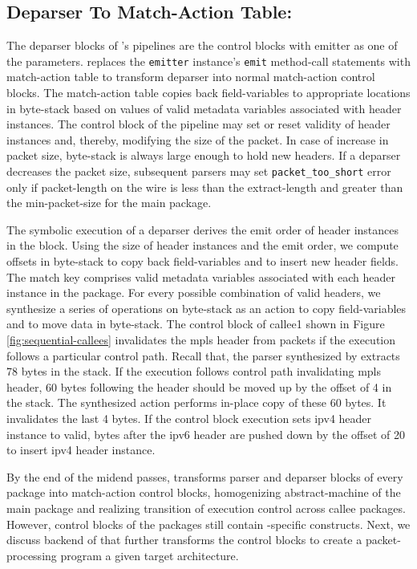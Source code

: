 \documentclass[letterpaper,twocolumn,10pt]{article}
\begin{document}
\subsection{Deparser To Match-Action Table:}
\label{subsection:deparser-to-match-action-table}
The deparser blocks of \uarch's pipelines are the control blocks with emitter as one of the parameters.
\ucomp replaces the \texttt{emitter} instance's \texttt{emit} method-call statements with match-action table to transform deparser into normal match-action control blocks.
The match-action table copies back field-variables to appropriate locations in byte-stack based on values of valid metadata variables associated with header instances. 
The control block of the pipeline may set or reset validity of header instances and, thereby, modifying the size of the packet.
In case of increase in packet size, byte-stack is always large enough to hold new headers.
If a deparser decreases the packet size, subsequent parsers may set \texttt{packet\_too\_short} error only if packet-length on the wire is less than the extract-length and greater than the min-packet-size for the main package.

The symbolic execution of a deparser derives the emit order of header instances in the block.
Using the size of header instances and the emit order, we compute offsets in byte-stack to copy back field-variables and to insert new header fields.
The match key comprises valid metadata variables associated with each header instance in the package.
For every possible combination of valid headers, we synthesize a series of operations on byte-stack as an action to copy field-variables and to move data in byte-stack.
The control block of callee1 shown in Figure \ref{fig:sequential-callees} invalidates the mpls header from packets if the execution follows a particular control path.
Recall that, the parser synthesized by \ucomp extracts 78 bytes in the stack.
If the execution follows control path invalidating mpls header, 60 bytes following the header should be moved up by the offset of 4 in the stack.
The synthesized action performs in-place copy of these 60 bytes. It invalidates the last 4 bytes.
If the control block execution sets ipv4 header instance to valid, bytes after the ipv6 header are pushed down by the offset of 20 to insert ipv4 header instance.


By the end of the midend passes, \ucomp transforms parser and deparser blocks of every package into match-action control blocks, homogenizing abstract-machine of the main package and realizing transition of execution control across callee packages.
However, control blocks of the packages still contain \uarch-specific constructs.
Next, we discuss backend of \ucomp that further transforms the control blocks to create a packet-processing program a given target architecture.
\end{document}
